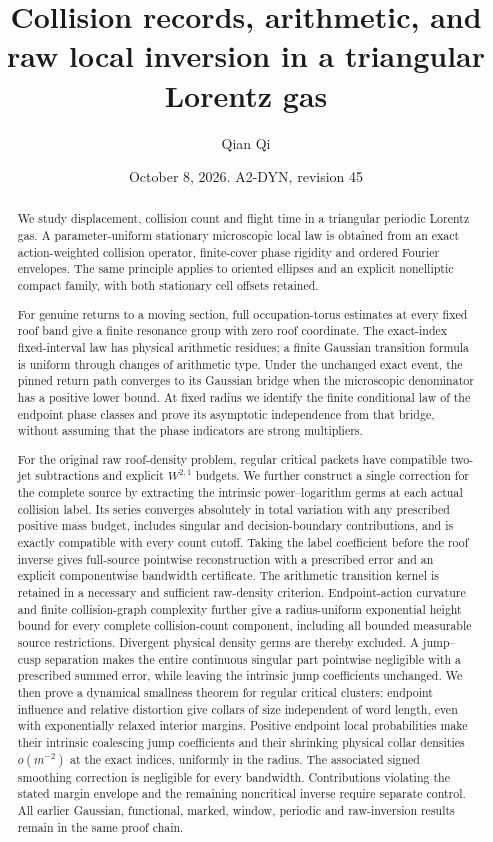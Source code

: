 \documentclass[11pt,reqno]{amsart}
\title[Collision records and raw local inversion]{Collision records, arithmetic, and raw local inversion in a triangular Lorentz gas}
\author{Qian Qi}
\date{October 8, 2026. A2-DYN, revision 45}
\numberwithin{equation}{section}
\theoremstyle{definition}\newtheorem{definition}[theorem]{Definition}
\theoremstyle{remark}\newtheorem{remark}[theorem]{Remark}
\begin{document}
\raggedbottom
\begin{abstract}
We study displacement, collision count and flight time in a triangular
periodic Lorentz gas. A parameter-uniform stationary microscopic local
law is obtained from an exact action-weighted collision operator,
finite-cover phase rigidity and ordered Fourier envelopes. The same
principle applies to oriented ellipses and an explicit nonelliptic
compact family, with both stationary cell offsets retained.

For genuine returns to a moving section, full occupation-torus
estimates at every fixed roof band give a finite resonance group with
zero roof coordinate. The exact-index fixed-interval law has physical
arithmetic residues; a finite Gaussian transition formula is uniform
through changes of arithmetic type. Under the unchanged exact event,
the pinned return path converges to its Gaussian bridge when the
microscopic denominator has a positive lower bound. At fixed radius
we identify the finite conditional law of the endpoint phase classes
and prove its asymptotic independence from that bridge, without
assuming that the phase indicators are strong multipliers.

For the original raw roof-density problem, regular critical packets
have compatible two-jet subtractions and explicit $W^{2,1}$ budgets.
We further construct a single correction for the complete source by
extracting the intrinsic power--logarithm germs at each actual collision
label. Its series converges absolutely in total variation with any
prescribed positive mass budget, includes singular and decision-boundary
contributions, and is exactly compatible with every count cutoff.
Taking the label coefficient before the roof inverse gives full-source
pointwise reconstruction with a prescribed error and an explicit
componentwise bandwidth certificate. The arithmetic transition kernel
is retained in a necessary and sufficient raw-density criterion.
Endpoint-action curvature and finite collision-graph complexity further
give a radius-uniform exponential height bound for every complete
collision-count component, including all bounded measurable source
restrictions. Divergent physical density germs are thereby excluded.
A jump--cusp separation makes the entire continuous singular part
pointwise negligible with a prescribed summed error, while leaving
the intrinsic jump coefficients unchanged. We then prove a dynamical
smallness theorem for regular critical clusters: endpoint influence and
relative distortion give collars of size independent of word length,
even with exponentially relaxed interior margins. Positive endpoint
local probabilities make their intrinsic coalescing jump coefficients
and their shrinking physical collar densities $o(m^{-2})$ at the exact
indices, uniformly in the radius. The associated signed smoothing
correction is negligible for every bandwidth. Contributions violating
the stated margin envelope and the remaining noncritical inverse
require separate control. All earlier Gaussian, functional,
marked, window, periodic and raw-inversion results remain in the same
proof chain.
\end{abstract}
\end{document}
